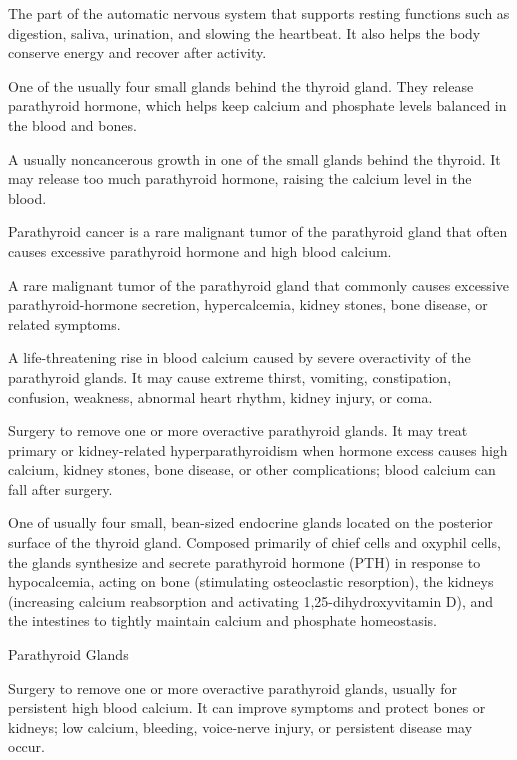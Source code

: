  The part of the automatic nervous system that supports resting functions such as digestion, saliva, urination, and slowing the heartbeat. It also helps the body conserve energy and recover after activity.

 One of the usually four small glands behind the thyroid gland. They release parathyroid hormone, which helps keep calcium and phosphate levels balanced in the blood and bones.

 A usually noncancerous growth in one of the small glands behind the thyroid. It may release too much parathyroid hormone, raising the calcium level in the blood.

 Parathyroid cancer is a rare malignant tumor of the parathyroid gland that often causes excessive parathyroid hormone and high blood calcium.

 A rare malignant tumor of the parathyroid gland that commonly causes excessive parathyroid-hormone secretion, hypercalcemia, kidney stones, bone disease, or related symptoms.

 A life-threatening rise in blood calcium caused by severe overactivity of the parathyroid glands. It may cause extreme thirst, vomiting, constipation, confusion, weakness, abnormal heart rhythm, kidney injury, or coma.

 Surgery to remove one or more overactive parathyroid glands. It may treat primary or kidney-related hyperparathyroidism when hormone excess causes high calcium, kidney stones, bone disease, or other complications; blood calcium can fall after surgery.

 One of usually four small, bean-sized endocrine glands located on the posterior surface of the thyroid gland. Composed primarily of chief cells and oxyphil cells, the glands synthesize and secrete parathyroid hormone (PTH) in response to hypocalcemia, acting on bone (stimulating osteoclastic resorption), the kidneys (increasing calcium reabsorption and activating 1,25-dihydroxyvitamin D), and the intestines to tightly maintain calcium and phosphate homeostasis.

\synonyms
Parathyroid Glands

 Surgery to remove one or more overactive parathyroid glands, usually for persistent high blood calcium. It can improve symptoms and protect bones or kidneys; low calcium, bleeding, voice-nerve injury, or persistent disease may occur.

